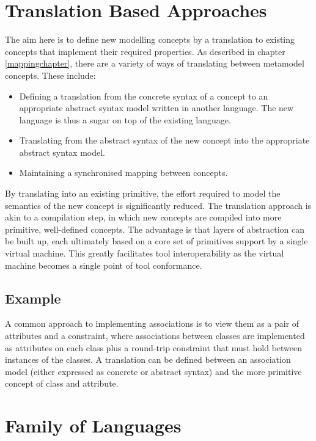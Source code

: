 \section{Translation Based Approaches}

The aim here is to define new modelling concepts by a translation
to existing concepts that implement their required properties. As
described in chapter \ref{mappingchapter}, there are a variety of
ways of translating between metamodel concepts. These include:

\begin{itemize}
\item Defining a translation from the concrete syntax of a
concept to an appropriate abstract syntax model written in another
language. The new language is thus a sugar on top of the existing
language.
\item Translating from the abstract syntax of the new concept into
the appropriate abstract syntax model.
\item Maintaining a synchronised mapping between concepts.
\end{itemize}

By translating into an existing primitive, the effort required to
model the semantics of the new concept is significantly reduced.
The translation approach is akin to a compilation step, in which
new concepts are compiled into more primitive, well-defined
concepts. The advantage is that layers of abstraction can be built
up, each ultimately based on a core set of primitives support by a
single virtual machine. This greatly facilitates tool
interoperability as the virtual machine becomes a single point of
tool conformance.

\subsection{Example}

A common approach to implementing associations is to view them as
a pair of attributes and a constraint, where associations between
classes are implemented  as attributes on each class plus a
round-trip constraint that must hold between instances of the
classes. A translation can be defined between an association model
(either expressed as concrete or abstract syntax) and the more
primitive concept of class and attribute.

\section{Family of Languages}
\label{families}

